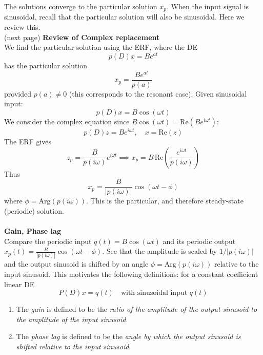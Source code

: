 \documentclass{report}
\begin{document}
The solutions converge to the particular solution $x_p$. When the input signal is sinusoidal, recall 
that the particular solution will also be sinusoidal. Here we review this.\\
(next page)
\newpage
\noindent\textbf{Review of Complex replacement}\\
We find the particular solution using the ERF, where the DE
\begin{equation*}
p(D)x=Be^{at}
\end{equation*}
has the particular solution
\begin{equation*}
x_p=\frac{Be^{at}}{p(a)}
\end{equation*}
provided $p(a)\neq0$ (this corresponds to the resonant case).
Given sinusoidal input:
\begin{equation*}
p(D)x=B\cos(\omega t)
\end{equation*}
We consider the complex equation since $B\cos(\omega t)=\text{Re}(Be^{i\omega t})$:
\begin{equation*}
p(D)z=Be^{i\omega t},\quad x=\text{Re}(z)
\end{equation*}
The ERF gives
\begin{equation*}
z_p=\frac{B}{p(i\omega)}e^{i\omega t}\implies x_p=B\,\text{Re}\left(\frac{e^{i\omega t}}{p(i\omega)}\right)
\end{equation*}
Thus
\begin{equation*}
x_p=\frac{B}{|p(i\omega)|}\cos(\omega t-\phi)
\end{equation*}
where $\phi=\text{Arg}(p(i\omega))$. This is the particular, and therefore steady-state (periodic) solution.\\
\vspace{1mm}\\
\textbf{Gain, Phase lag}\\
Compare the periodic input $q(t)=B\cos(\omega t)$ and its
periodic output $x_p(t)=\frac{B}{|p(i\omega)|}\cos(\omega t-\phi)$. See that the amplitude is scaled by 
$1/|p(i\omega)|$ and the output sinusoid is shifted by an angle $\phi=\text{Arg}(p(i\omega))$ relative
to the input sinusoid. This motivates the following definitions: for a constant coefficient linear DE
\begin{equation*}
P(D)x=q(t)\quad\text{with sinusoidal input } q(t)
\end{equation*}
\begin{enumerate}
\item The \textit{gain} is defined to be the \textit{ratio of the amplitude of the output sinusoid to the 
amplitude of the input sinusoid}.
\item The \textit{phase lag} is defined to be the \textit{angle by which the output
sinusoid is shifted relative to the input sinusoid}.
\end{enumerate}
\end{document}
